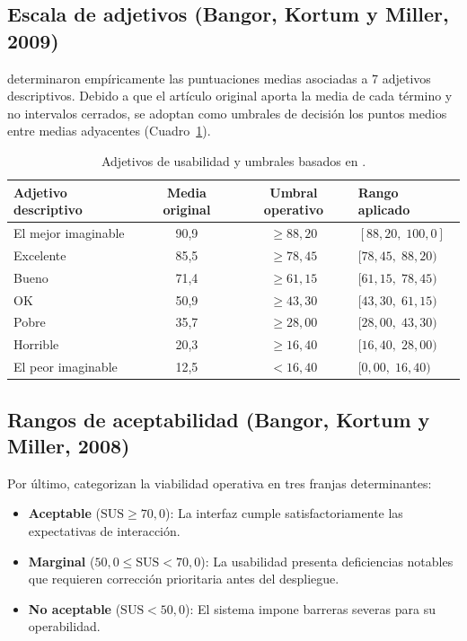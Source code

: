 \documentclass[11pt,a4paper]{article}
\begin{document}
\subsection{Escala de adjetivos (Bangor, Kortum y Miller, 2009)}
\textcite{Bangor2009} determinaron empíricamente las puntuaciones medias asociadas a 7 adjetivos descriptivos. Debido a que el artículo original aporta la media de cada término y no intervalos cerrados, se adoptan como umbrales de decisión los puntos medios entre medias adyacentes (Cuadro~\ref{tab:adjetivos}).

\begin{table}[htbp]
\centering
\small
\begin{tabular}{lccl}
\toprule
\textbf{Adjetivo descriptivo} & \textbf{Media original} & \textbf{Umbral operativo} & \textbf{Rango aplicado} \\
\midrule
El mejor imaginable & 90{,}9 & $\ge 88{,}20$ & $[88{,}20,\; 100{,}0]$ \\
Excelente           & 85{,}5 & $\ge 78{,}45$ & $[78{,}45,\; 88{,}20)$ \\
Bueno               & 71{,}4 & $\ge 61{,}15$ & $[61{,}15,\; 78{,}45)$ \\
OK                  & 50{,}9 & $\ge 43{,}30$ & $[43{,}30,\; 61{,}15)$ \\
Pobre               & 35{,}7 & $\ge 28{,}00$ & $[28{,}00,\; 43{,}30)$ \\
Horrible            & 20{,}3 & $\ge 16{,}40$ & $[16{,}40,\; 28{,}00)$ \\
El peor imaginable  & 12{,}5 & $< 16{,}40$   & $[0{,}00,\; 16{,}40)$  \\
\bottomrule
\end{tabular}
\caption{Adjetivos de usabilidad y umbrales basados en \textcite{Bangor2009}.}
\label{tab:adjetivos}
\end{table}

\subsection{Rangos de aceptabilidad (Bangor, Kortum y Miller, 2008)}
Por último, \textcite{Bangor2008} categorizan la viabilidad operativa en tres franjas determinantes:
\begin{itemize}
    \item \textbf{Aceptable} ($\text{SUS} \ge 70{,}0$): La interfaz cumple satisfactoriamente las expectativas de interacción.
    \item \textbf{Marginal} ($50{,}0 \le \text{SUS} < 70{,}0$): La usabilidad presenta deficiencias notables que requieren corrección prioritaria antes del despliegue.
    \item \textbf{No aceptable} ($\text{SUS} < 50{,}0$): El sistema impone barreras severas para su operabilidad.
\end{itemize}
\end{document}
